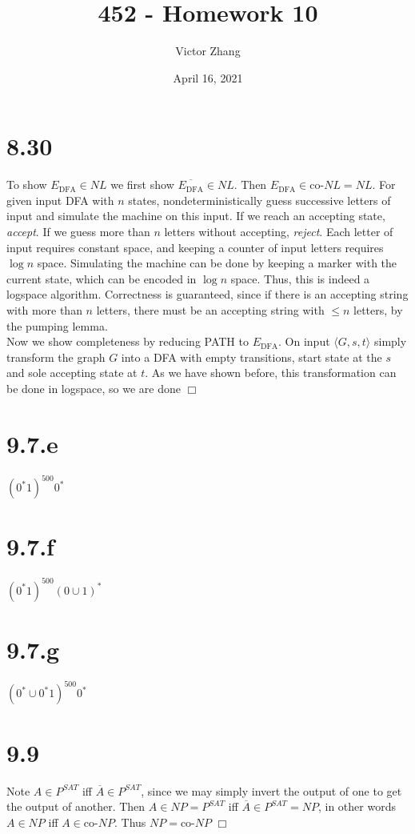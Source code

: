 \documentclass{article}
\title{452 - Homework 10}
\author{Victor Zhang}
\date{April 16, 2021}
\begin{document}
\maketitle

\section*{8.30}
To show $E_{\mathrm{DFA}} \in NL$ we first show $\overline{E_{\mathrm{DFA}}} \in NL$. Then $E_{\mathrm{DFA}} \in \text{co-}NL = NL$. For given input DFA with $n$ states, nondeterministically guess successive letters of input and simulate the machine on this input. If we reach an accepting state, \textit{accept}. If we guess more than $n$ letters without accepting, \textit{reject}. Each letter of input requires constant space, and keeping a counter of input letters requires $\log n$ space. Simulating the machine can be done by keeping a marker with the current state, which can be encoded in $\log n$ space. Thus, this is indeed a logspace algorithm. Correctness is guaranteed, since if there is an accepting string with more than $n$ letters, there must be an accepting string with $\leqslant n$ letters, by the pumping lemma.\\
Now we show completeness by reducing PATH to $E_{\mathrm{DFA}}$. On input $\langle G,s,t \rangle$ simply transform the graph $G$ into a DFA with empty transitions, start state at the $s$ and sole accepting state at $t$. As we have shown before, this transformation can be done in logspace, so we are done $\Box$

\section*{9.7.e}
$(0^*1)^{500}0^*$

\section*{9.7.f}
$(0^*1)^{500}(0\cup1)^*$

\section*{9.7.g}
$(0^* \cup 0^*1)^{500}0^*$

\section*{9.9}
Note $A \in P^{SAT}$ iff $\overline{A} \in P^{SAT}$, since we may simply invert the output of one to get the output of another. Then $A \in NP = P^{SAT}$ iff $\overline{A} \in P^{SAT} = NP$, in other words $A \in NP$ iff $A \in \text{co-}NP$. Thus $NP = \text{co-}NP$ $\Box$
\end{document}

